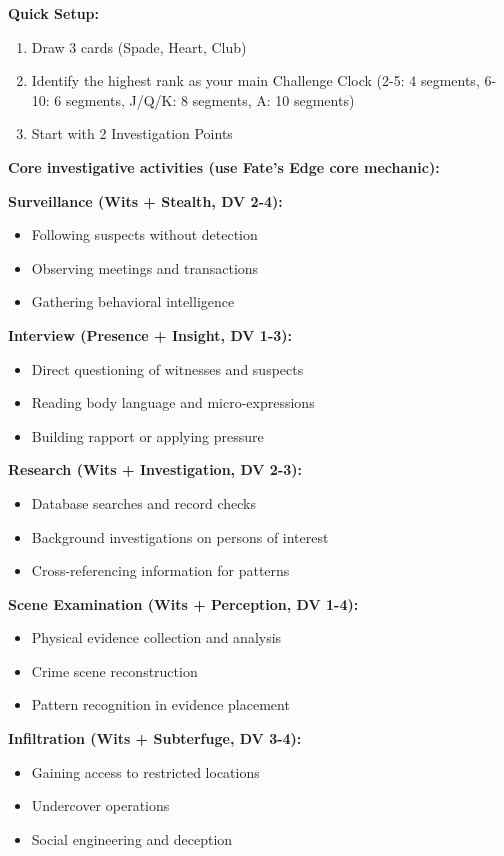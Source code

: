 \documentclass[11pt]{article}
\begin{document}
\textbf{Quick Setup:}
\begin{enumerate}
    \item Draw 3 cards (Spade, Heart, Club)
    \item Identify the highest rank as your main Challenge Clock (2-5: 4 segments, 6-10: 6 segments, J/Q/K: 8 segments, A: 10 segments)
    \item Start with 2 Investigation Points
\end{enumerate}

\textbf{Core investigative activities (use Fate's Edge core mechanic):}

\textbf{Surveillance (Wits + Stealth, DV 2-4):}
\begin{itemize}
    \item Following suspects without detection
    \item Observing meetings and transactions
    \item Gathering behavioral intelligence
\end{itemize}

\textbf{Interview (Presence + Insight, DV 1-3):}
\begin{itemize}
    \item Direct questioning of witnesses and suspects
    \item Reading body language and micro-expressions
    \item Building rapport or applying pressure
\end{itemize}

\textbf{Research (Wits + Investigation, DV 2-3):}
\begin{itemize}
    \item Database searches and record checks
    \item Background investigations on persons of interest
    \item Cross-referencing information for patterns
\end{itemize}

\textbf{Scene Examination (Wits + Perception, DV 1-4):}
\begin{itemize}
    \item Physical evidence collection and analysis
    \item Crime scene reconstruction
    \item Pattern recognition in evidence placement
\end{itemize}

\textbf{Infiltration (Wits + Subterfuge, DV 3-4):}
\begin{itemize}
    \item Gaining access to restricted locations
    \item Undercover operations
    \item Social engineering and deception
\end{itemize}
\end{document}

